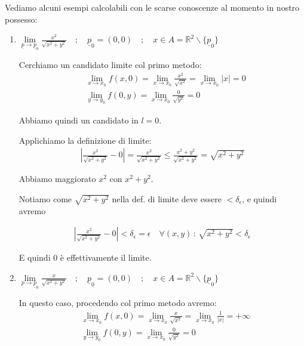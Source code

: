 Vediamo alcuni esempi calcolabili con le scarse conoscenze al momento in nostro possesso:
\begin{enumerate}
	\item $\underset{\underline{p}\rightarrow \underline{p}_0}{\lim} \frac{x^2}{\sqrt{x^2 + y^2}} \quad ; \quad \underline{p}_0=(0,0) \quad ; \quad  x\in A=\mathbb{R}^2\backslash \{\underline{p}_0\}$
	
	\bigskip
	Cerchiamo un candidato limite col primo metodo:
	\begin{align}
	{}&\underset{x\rightarrow x_0}{\lim}f(x,0)= \underset{x\rightarrow x_0}{\lim} \frac{x^2}{\sqrt{x^2}}= \underset{x\rightarrow x_0}{\lim} |x| = 0\\
	&\underset{y\rightarrow y_0}{\lim}f(0,y)= \underset{x\rightarrow x_0}{\lim} \frac{0}{\sqrt{y^2}}= 0
	\end{align}
	
	Abbiamo quindi un candidato in $l=0$.
	
	Applichiamo la definizione di limite:
	\begin{align}
	\left|\frac{x^2}{\sqrt{x^2 + y^2}}-0\right| = \frac{x^2}{\sqrt{x^2 + y^2}}\leq \frac{x^2 + y^2}{\sqrt{x^2 + y^2}}=\sqrt{x^2 + y^2}
	\end{align}
	
	Abbiamo maggiorato $x^2$ con $x^2 + y^2$.
	
	Notiamo come $\sqrt{x^2 + y^2}$ nella def. di limite deve essere $<\delta_\epsilon$, e quindi avremo
	
	\begin{align}
	\left|\frac{x^2}{\sqrt{x^2 + y^2}}-0\right|< \delta_\epsilon=\epsilon \quad \forall (x,y) \, : \, \sqrt{x^2 + y^2}<\delta_\epsilon
	\end{align}
	
	E quindi $0$ è effettivamente il limite.
	
	\item $\underset{\underline{p}\rightarrow \underline{p}_0}{\lim} \frac{x}{\sqrt{x^2 + y^2}} \quad ; \quad \underline{p}_0=(0,0) \quad ; \quad  x\in A=\mathbb{R}^2\backslash \{\underline{p}_0\}$
	
	\bigskip
	In questo caso, procedendo col primo metodo avremo:
	\begin{align}
	{}&\underset{x\rightarrow x_0}{\lim}f(x,0)= \underset{x\rightarrow x_0}{\lim} \frac{x}{\sqrt{x^2}}= \underset{x\rightarrow x_0}{\lim} \frac{1}{|x|} = +\infty\\
	&\underset{y\rightarrow y_0}{\lim}f(0,y)= \underset{x\rightarrow x_0}{\lim} \frac{0}{\sqrt{y^2}}= 0
	\end{align}
	

\end{enumerate}
